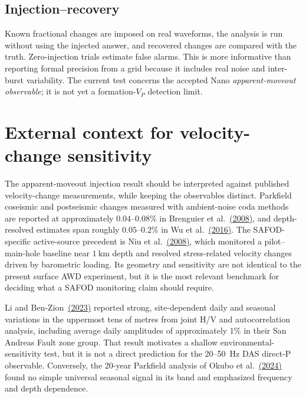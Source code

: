 \documentclass[11pt]{article}
\begin{document}
\subsection{Injection--recovery}

Known fractional changes are imposed on real waveforms, the analysis is run
without using the injected answer, and recovered changes are compared with the
truth.  Zero-injection trials estimate false alarms.  This is more informative
than reporting formal precision from a grid because it includes real noise and
inter-burst variability.  The current test concerns the accepted Nano
\emph{apparent-moveout observable}; it is not yet a formation-$V_P$ detection
limit.

\section{External context for velocity-change sensitivity}

The apparent-moveout injection result should be interpreted against published
velocity-change measurements, while keeping the observables distinct.  Parkfield
coseismic and postseismic changes measured with ambient-noise coda methods are
reported at approximately $0.04$--$0.08\%$ in Brenguier et al.~\href{https://doi.org/10.1126/science.1160943}{(2008)},
and depth-resolved estimates span roughly $0.05$--$0.2\%$ in Wu et al.~\href{https://agupubs.onlinelibrary.wiley.com/doi/abs/10.1002/2016GL069145}{(2016)}.
The SAFOD-specific active-source precedent is Niu et al.~\href{https://doi.org/10.1038/nature07111}{(2008)},
which monitored a pilot--main-hole baseline near $1~\mathrm{km}$ depth and
resolved stress-related velocity changes driven by barometric loading.  Its
geometry and sensitivity are not identical to the present surface AWD experiment,
but it is the most relevant benchmark for deciding what a SAFOD monitoring claim
should require.

Li and Ben-Zion~\href{https://agupubs.onlinelibrary.wiley.com/doi/full/10.1029/2022JB025682}{(2023)}
reported strong, site-dependent daily and seasonal variations in the uppermost
tens of metres from joint H/V and autocorrelation analysis, including average
daily amplitudes of approximately $1\%$ in their San Andreas Fault zone group.
That result motivates a shallow environmental-sensitivity test, but it is not a
direct prediction for the 20--50~Hz DAS direct-P observable.  Conversely, the
20-year Parkfield analysis of Okubo et al.~\href{https://agupubs.onlinelibrary.wiley.com/doi/full/10.1029/2023JB028084}{(2024)}
found no simple universal seasonal signal in its band and emphasized frequency
and depth dependence.
\end{document}
